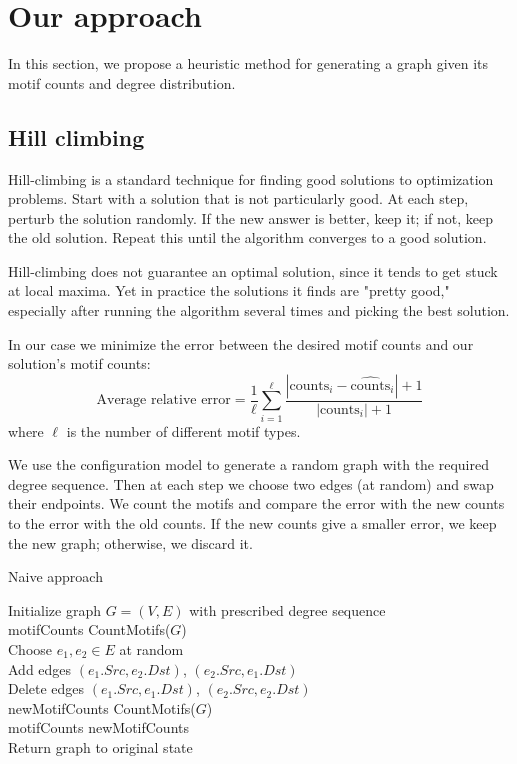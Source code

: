 \section{Our approach}
\label{sec:approach-hillclimbing}

In this section, we propose a heuristic method for generating a graph given its motif counts and degree distribution.

\subsection{Hill climbing}
Hill-climbing is a standard technique for finding good solutions to optimization problems.  Start with a solution that is not particularly good.  At each step, perturb the solution randomly.  If the new answer is better, keep it; if not, keep the old solution.  Repeat this until the algorithm converges to a good solution.

Hill-climbing does not guarantee an optimal solution, since it tends to get stuck at local maxima.  Yet in practice the solutions it finds are "pretty good," especially after running the algorithm several times and picking the best solution.

In our case we minimize the error between the desired motif counts and our solution's motif counts:
\begin{equation}
\label{eqn:avgRelativeError}
\mbox{Average relative error} = \frac{1}{\ell} \sum_{i = 1}^{\ell} \frac{|\mbox{counts}_i - \widehat{\mbox{counts}}_i| + 1}{|\mbox{counts}_i| + 1}
\end{equation}
where $\ell$ is the number of different motif types.

We use the configuration model to generate a random graph with the required degree sequence.  Then at each step we choose two edges (at random) and swap their endpoints.  We count the motifs and compare the error with the new counts to the error with the old counts.  If the new counts give a smaller error, we keep the new graph; otherwise, we discard it.

\begin{algorithm}[t]
\caption{Naive approach}
\label{algorithm:naive}
\begin{algorithmic}
Initialize graph $G = (V, E)$ with prescribed degree sequence\\
motifCounts \leftarrow CountMotifs($G$)\\
 {
	Choose $e_1, e_2 \in E$ at random\\
	Add edges $(e_1.Src, e_2.Dst)$, $(e_2.Src, e_1.Dst)$\\
	Delete edges $(e_1.Src, e_1.Dst)$, $(e_2.Src, e_2.Dst)$\\
	newMotifCounts \leftarrow CountMotifs($G$)\\
	 {
		motifCounts \leftarrow newMotifCounts\\
	} {
		Return graph to original state\\
	}
}

\end{algorithmic}
\end{algorithm}

